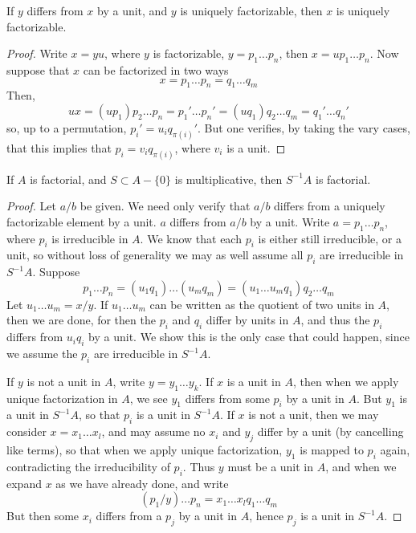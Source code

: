 \begin{lemma}
    If $y$ differs from $x$ by a unit, and $y$ is uniquely factorizable, then $x$ is uniquely factorizable.
\end{lemma}
\begin{proof}
    Write $x = yu$, where $y$ is factorizable, $y = p_1 \dots p_n$, then $x = u p_1 \dots p_n$. Now suppose that $x$ can be factorized in two ways
    \[ x = p_1 \dots p_n = q_1 \dots q_m \]
    Then,
    \[ ux = (up_1) p_2 \dots p_n = p_1' \dots p_n' = (uq_1) q_2 \dots q_m = q_1' \dots q_n' \]
    so, up to a permutation, $p_i' = u_i q_{\pi(i)}'$. But one verifies, by taking the vary cases, that this implies that $p_i = v_i q_{\pi(i)}$, where $v_i$ is a unit.
\end{proof}

\begin{theorem}
    If $A$ is factorial, and $S \subset A - \{ 0 \}$ is multiplicative, then $S^{-1}A$ is factorial.
\end{theorem}
\begin{proof}
    Let $a/b$ be given. We need only verify that $a/b$ differs from a uniquely factorizable element by a unit. $a$ differs from $a/b$ by a unit. Write $a = p_1 \dots p_n$, where $p_i$ is irreducible in $A$. We know that each $p_i$ is either still irreducible, or a unit, so without loss of generality we may as well assume all $p_i$ are irreducible in $S^{-1}A$. Suppose
    \[ p_1 \dots p_n = (u_1 q_1) \dots (u_m q_m) = (u_1 \dots u_m q_1) q_2 \dots q_m \]
    Let $u_1 \dots u_m = x/y$. If $u_1 \dots u_m$ can be written as the quotient of two units in $A$, then we are done, for then the $p_i$ and $q_i$ differ by units in $A$, and thus the $p_i$ differs from $u_i q_i$ by a unit. We show this is the only case that could happen, since we assume the $p_i$ are irreducible in $S^{-1}A$.

    If $y$ is not a unit in $A$, write $y = y_1 \dots y_k$. If $x$ is a unit in $A$, then when we apply unique factorization in $A$, we see $y_1$ differs from some $p_i$ by a unit in $A$. But $y_1$ is a unit in $S^{-1}A$, so that $p_i$ is a unit in $S^{-1}A$. If $x$ is not a unit, then we may consider $x = x_1 \dots x_{l}$, and may assume no $x_i$ and $y_j$ differ by a unit (by cancelling like terms), so that when we apply unique factorization, $y_1$ is mapped to $p_i$ again, contradicting the irreducibility of $p_i$. Thus $y$ must be a unit in $A$, and when we expand $x$ as we have already done, and write
    \[ (p_1/y) \dots p_n = x_1 \dots x_{l} q_1 \dots q_m \]
    But then some $x_i$ differs from a $p_j$ by a unit in $A$, hence $p_j$ is a unit in $S^{-1}A$.
\end{proof}

